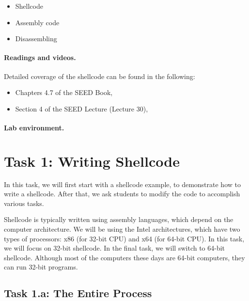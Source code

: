 \begin{itemize}[noitemsep]
\item Shellcode
\item Assembly code
\item Disassembling 
\end{itemize}


\paragraph{Readings and videos.}
Detailed coverage of the shellcode can be found in the following:

\begin{itemize}
\item Chapters 4.7 of the SEED Book, \seedbook
\item Section 4 of the SEED Lecture (Lecture 30), \seedcsvideo
\end{itemize}


\paragraph{Lab environment.} \seedenvironmentC


\section{Task 1: Writing Shellcode}


In this task, we will first start with a shellcode example,
to demonstrate how to write a shellcode. After that, we ask
students to modify the code to accomplish various tasks. 

Shellcode is typically written using assembly languages, which
depend on the computer architecture. We will be using 
the Intel architectures, which have two types of processors:
x86 (for 32-bit CPU) and x64 (for 64-bit CPU). In this 
task, we will focus on 32-bit shellcode. In the final task,
we will switch to 64-bit shellcode.  
Although most of the computers these days are 64-bit computers,
they can run 32-bit programs. 


\subsection{Task 1.a: The Entire Process}

